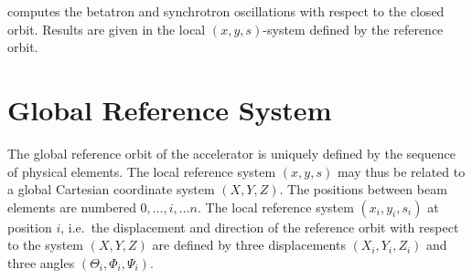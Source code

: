 \opalmap computes the betatron and synchrotron oscillations
with respect to the closed orbit.
Results are given in the local $(x, y, s)$-system
defined by the reference orbit.

\section{Global Reference System}

The global reference orbit 
of the accelerator is uniquely defined by the sequence of physical elements.
The local reference system $(x, y, s)$
may thus be related to a global Cartesian coordinate system $(X, Y, Z)$.
The positions between beam elements are numbered $0, \ldots , i, \ldots n$.
The local reference system $(x_i, y_i, s_i)$ at position $i$,
i.e.\ the displacement and direction of the reference orbit
with respect to the system $(X, Y, Z)$ are defined by three displacements
$(X_i, Y_i, Z_i)$ and three angles $(\Theta_i, \Phi_i, \Psi_i)$.

